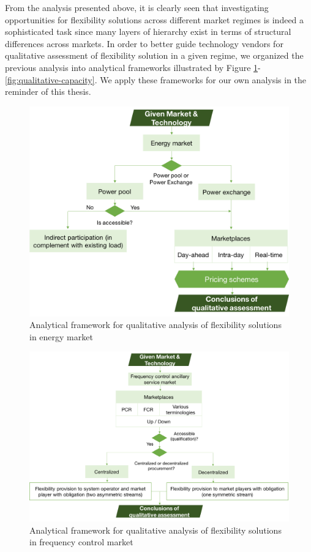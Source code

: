 From the analysis presented above, it is clearly seen that investigating opportunities for flexibility solutions across different market regimes is indeed a sophisticated task since many layers of hierarchy exist in terms of structural differences across markets. In order to better guide technology vendors for qualitative assessment of flexibility solution in a given regime, we organized the previous analysis into analytical frameworks illustrated by Figure \ref{fig:qualitative-energy}-\ref{fig:qualitative-capacity}. We apply these frameworks for our own analysis in the reminder of this thesis.

\begin{figure}[h!]
	\centering
	\includegraphics[width=0.95\linewidth]{Figures/Q_energy}
	\caption{Analytical framework for qualitative analysis of flexibility solutions in energy market}
	\label{fig:qualitative-energy}
\end{figure}

\begin{figure}[h!]
	\centering
	\includegraphics[width=0.95\linewidth]{Figures/Q_frequency_control}
	\caption{Analytical framework for qualitative analysis of flexibility solutions in frequency control market}
	\label{fig:qualitative-fr}
\end{figure}

